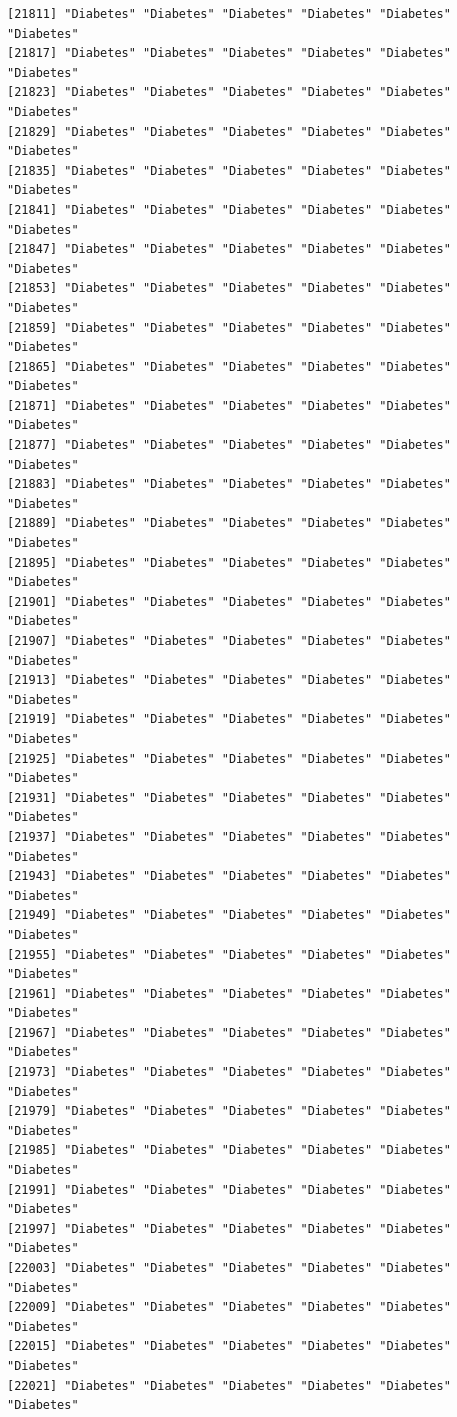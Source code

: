 \documentclass[
  letterpaper,
  DIV=11,
  numbers=noendperiod]{scrartcl}
\begin{document}
\begin{verbatim}
[21811] "Diabetes" "Diabetes" "Diabetes" "Diabetes" "Diabetes" "Diabetes"
[21817] "Diabetes" "Diabetes" "Diabetes" "Diabetes" "Diabetes" "Diabetes"
[21823] "Diabetes" "Diabetes" "Diabetes" "Diabetes" "Diabetes" "Diabetes"
[21829] "Diabetes" "Diabetes" "Diabetes" "Diabetes" "Diabetes" "Diabetes"
[21835] "Diabetes" "Diabetes" "Diabetes" "Diabetes" "Diabetes" "Diabetes"
[21841] "Diabetes" "Diabetes" "Diabetes" "Diabetes" "Diabetes" "Diabetes"
[21847] "Diabetes" "Diabetes" "Diabetes" "Diabetes" "Diabetes" "Diabetes"
[21853] "Diabetes" "Diabetes" "Diabetes" "Diabetes" "Diabetes" "Diabetes"
[21859] "Diabetes" "Diabetes" "Diabetes" "Diabetes" "Diabetes" "Diabetes"
[21865] "Diabetes" "Diabetes" "Diabetes" "Diabetes" "Diabetes" "Diabetes"
[21871] "Diabetes" "Diabetes" "Diabetes" "Diabetes" "Diabetes" "Diabetes"
[21877] "Diabetes" "Diabetes" "Diabetes" "Diabetes" "Diabetes" "Diabetes"
[21883] "Diabetes" "Diabetes" "Diabetes" "Diabetes" "Diabetes" "Diabetes"
[21889] "Diabetes" "Diabetes" "Diabetes" "Diabetes" "Diabetes" "Diabetes"
[21895] "Diabetes" "Diabetes" "Diabetes" "Diabetes" "Diabetes" "Diabetes"
[21901] "Diabetes" "Diabetes" "Diabetes" "Diabetes" "Diabetes" "Diabetes"
[21907] "Diabetes" "Diabetes" "Diabetes" "Diabetes" "Diabetes" "Diabetes"
[21913] "Diabetes" "Diabetes" "Diabetes" "Diabetes" "Diabetes" "Diabetes"
[21919] "Diabetes" "Diabetes" "Diabetes" "Diabetes" "Diabetes" "Diabetes"
[21925] "Diabetes" "Diabetes" "Diabetes" "Diabetes" "Diabetes" "Diabetes"
[21931] "Diabetes" "Diabetes" "Diabetes" "Diabetes" "Diabetes" "Diabetes"
[21937] "Diabetes" "Diabetes" "Diabetes" "Diabetes" "Diabetes" "Diabetes"
[21943] "Diabetes" "Diabetes" "Diabetes" "Diabetes" "Diabetes" "Diabetes"
[21949] "Diabetes" "Diabetes" "Diabetes" "Diabetes" "Diabetes" "Diabetes"
[21955] "Diabetes" "Diabetes" "Diabetes" "Diabetes" "Diabetes" "Diabetes"
[21961] "Diabetes" "Diabetes" "Diabetes" "Diabetes" "Diabetes" "Diabetes"
[21967] "Diabetes" "Diabetes" "Diabetes" "Diabetes" "Diabetes" "Diabetes"
[21973] "Diabetes" "Diabetes" "Diabetes" "Diabetes" "Diabetes" "Diabetes"
[21979] "Diabetes" "Diabetes" "Diabetes" "Diabetes" "Diabetes" "Diabetes"
[21985] "Diabetes" "Diabetes" "Diabetes" "Diabetes" "Diabetes" "Diabetes"
[21991] "Diabetes" "Diabetes" "Diabetes" "Diabetes" "Diabetes" "Diabetes"
[21997] "Diabetes" "Diabetes" "Diabetes" "Diabetes" "Diabetes" "Diabetes"
[22003] "Diabetes" "Diabetes" "Diabetes" "Diabetes" "Diabetes" "Diabetes"
[22009] "Diabetes" "Diabetes" "Diabetes" "Diabetes" "Diabetes" "Diabetes"
[22015] "Diabetes" "Diabetes" "Diabetes" "Diabetes" "Diabetes" "Diabetes"
[22021] "Diabetes" "Diabetes" "Diabetes" "Diabetes" "Diabetes" "Diabetes"

\end{verbatim}
\end{document}
